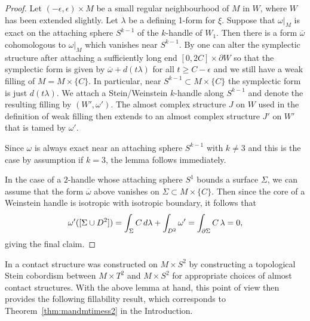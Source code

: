 \documentclass[12pt]{amsart}
\theoremstyle{remark}
\begin{document}
\begin{proof}
Let $(-\epsilon,\epsilon) \times M$ be a small regular neighbourhood
of $M$ in $W$, where $W$ has been extended slightly. Let $\lambda$ be
a defining 1-form for $\xi$. Suppose that $\omega|_M$ is exact on the
attaching sphere $S^{k-1}$ of the $k$-handle of $W_1$. Then there is a form
$\overline{\omega}$ cohomologous to $\omega|_M$ which vanishes near
$S^{k-1}$. By \cite[Lemma~1.10]{Massot12} one can alter the symplectic
structure after attaching a sufficiently long end $ [0,2C] \times
\partial W$ so that the symplectic form is given by $\overline{\omega}
+ d(t \lambda)$ for all $t \ge C - \epsilon$ and we still have a weak
filling of $M = M \times \{C\}$. In particular, near $S^{k-1} \subset
M \times \{C\}$ the symplectic form is just $d(t \lambda)$. We attach
a Stein/Weinstein $k$-handle along $S^{k-1}$ and denote the resulting
filling by $(W',\omega')$. The almost complex structure $J$ on $W$
used in the definition of weak filling then extends to an almost
complex structure $J'$ on $W'$ that is tamed by $\omega'$.

Since $\omega $ is always exact near an attaching sphere $S^{k-1}$
with $k\ne 3$ and this is the case by assumption if $k=3$, the lemma
follows immediately.

In the case of a $2$-handle whose attaching sphere $S^1$ bounds a
surface $\Sigma$, we can assume that the form $\overline{\omega}$
above vanishes on $\Sigma \subset M \times \{C\}$. Then since the core
of a Weinstein handle is isotropic with isotropic boundary, it
follows that
$$\omega'([\Sigma \cup D^2]) = \int_\Sigma C \thinspace d\lambda +
\int_{D^2} \omega' = \int_{\partial \Sigma} C\thinspace \lambda = 0,$$
giving the final claim. 
\end{proof}

In \cite{BCS1} a contact structure was constructed on $M\times S^2$ by 
constructing a topological Stein cobordism between $M\times T^2$ and
$M\times S^2$ for appropriate choices of almost
contact structures.  With the above lemma at hand, this point of view
then provides the following fillability result, which corresponds to 
Theorem~\ref{thm:mandmtimess2} in the Introduction.
\end{document}
